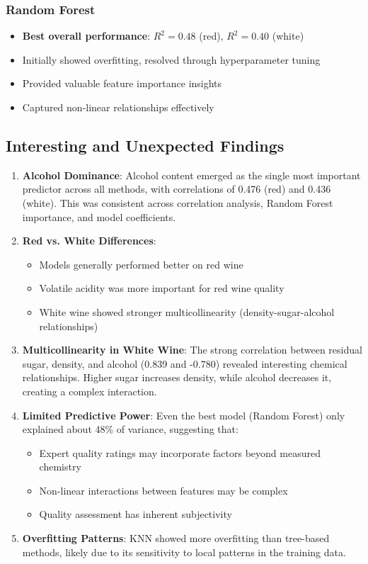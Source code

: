 \documentclass[12pt]{article}
\begin{document}
\subsubsection{Random Forest}
\begin{itemize}
    \item \textbf{Best overall performance}: $R^2 = 0.48$ (red), $R^2 = 0.40$ (white)
    \item Initially showed overfitting, resolved through hyperparameter tuning
    \item Provided valuable feature importance insights
    \item Captured non-linear relationships effectively
\end{itemize}

\subsection{Interesting and Unexpected Findings}

\begin{enumerate}
    \item \textbf{Alcohol Dominance}: Alcohol content emerged as the single most important predictor across all methods, with correlations of 0.476 (red) and 0.436 (white). This was consistent across correlation analysis, Random Forest importance, and model coefficients.
    
    \item \textbf{Red vs. White Differences}: 
    \begin{itemize}
        \item Models generally performed better on red wine
        \item Volatile acidity was more important for red wine quality
        \item White wine showed stronger multicollinearity (density-sugar-alcohol relationships)
    \end{itemize}
    
    \item \textbf{Multicollinearity in White Wine}: The strong correlation between residual sugar, density, and alcohol (0.839 and -0.780) revealed interesting chemical relationships. Higher sugar increases density, while alcohol decreases it, creating a complex interaction.
    
    \item \textbf{Limited Predictive Power}: Even the best model (Random Forest) only explained about 48\% of variance, suggesting that:
    \begin{itemize}
        \item Expert quality ratings may incorporate factors beyond measured chemistry
        \item Non-linear interactions between features may be complex
        \item Quality assessment has inherent subjectivity
    \end{itemize}
    
    \item \textbf{Overfitting Patterns}: KNN showed more overfitting than tree-based methods, likely due to its sensitivity to local patterns in the training data.
\end{enumerate}
\end{document}
